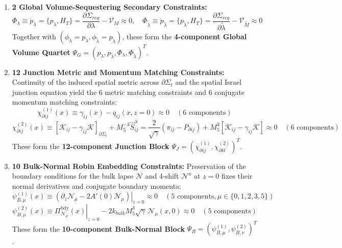 \documentclass[aps,prd,onecolumn,superscriptaddress,nofootinbib,longbibliography,10pt]{revtex4-2}
\begin{document}
{{\begin{enumerate}
\item \textbf{2 Global Volume-Sequestering Secondary Constraints:}
    \[ \Phi_\lambda \equiv \dot{p}_\lambda = \{p_\lambda, H_T\} = \frac{\partial\Sigma_{reg}}{\partial\lambda} - \mathcal{V}_M \approx 0, \quad \Phi_{\tilde{\lambda}} \equiv \dot{p}_{\tilde{\lambda}} = \{p_{\tilde{\lambda}}, H_T\} = \frac{\partial\Sigma_{reg}}{\partial\tilde{\lambda}} - \mathcal{V}_{\tilde{M}} \approx 0 \]
    Together with \((\phi_\lambda = p_\lambda, \phi_{\tilde{\lambda}} = p_{\tilde{\lambda}})\), these form the \textbf{4-component Global Volume Quartet} \(\Psi_G = (p_\lambda, p_{\tilde{\lambda}}, \Phi_\lambda, \Phi_{\tilde{\lambda}})^T\).
    
\item \textbf{12 Junction Metric and Momentum Matching Constraints:} Continuity of the induced spatial metric across \(\partial\Sigma_t\) and the spatial Israel junction equation yield the 6 metric matching constraints and 6 conjugate momentum matching constraints:
    \[ \chi_{\partial ij}^{(1)}(x) \equiv \gamma_{ij}(x) - q_{ij}(x, z=0) \approx 0 \quad (6\text{ components}) \]
    \[ \chi_{\partial ij}^{(2)}(x) \equiv [\mathcal{K}_{ij} - \gamma_{ij}\mathcal{K}]_{\partial\Sigma_t} + M_5^{-3}\hat{S}^\partial_{ij} = \frac{2}{\sqrt{\gamma}}(\pi_{ij} - P_{\partial ij}) + M_5^3[\mathcal{K}_{ij} - \gamma_{ij}\mathcal{K}] \approx 0 \quad (6\text{ components}) \]
    These form the \textbf{12-component Junction Block} \(\Psi_J = (\chi_{\partial ij}^{(1)}, \chi_{\partial kl}^{(2)})^T\).
    
\item \textbf{10 Bulk-Normal Robin Embedding Constraints:} Preservation of the boundary conditions for the bulk lapse \(\mathcal{N}\) and 4-shift \(\mathcal{N}^a\) at \(z = 0\) fixes their normal derivatives and conjugate boundary momenta:
    \[ \psi_{B,\mu}^{(1)}(x) \equiv \left.\left(\partial_z \mathcal{N}_\mu - 2A'(0)\mathcal{N}_\mu\right)\right|_{z=0} \approx 0 \quad (5\text{ components}, \mu \in \{0,1,2,3,5\}) \]
    \[ \psi_{B,\mu}^{(2)}(x) \equiv \left.\Pi_{\mathcal{N}_\mu}^{\text{bdy}}(x)\right|_{z=0} - 2k_{bulk}M_5^3\sqrt{\gamma}\,\mathcal{N}_\mu(x,0) \approx 0 \quad (5\text{ components}) \]
    These form the \textbf{10-component Bulk-Normal Block} \(\Psi_B = (\psi_{B,\mu}^{(1)}, \psi_{B,\nu}^{(2)})^T\).
    

\end{enumerate}}}
\end{document}
